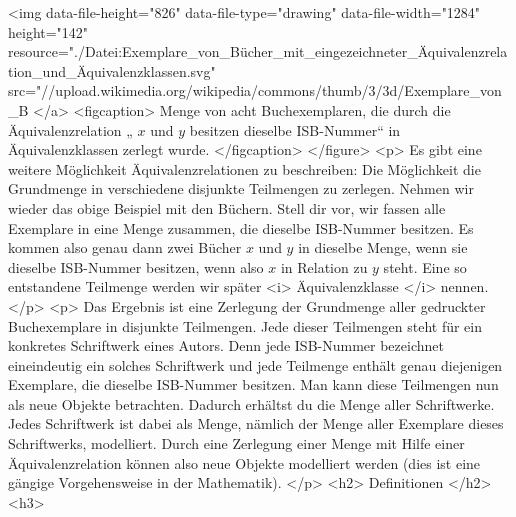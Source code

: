     <img data-file-height="826" data-file-type="drawing" data-file-width="1284" height="142" resource="./Datei:Exemplare_von_Bücher_mit_eingezeichneter_Äquivalenzrelation_und_Äquivalenzklassen.svg" src="//upload.wikimedia.org/wikipedia/commons/thumb/3/3d/Exemplare_von_B%
   </a>
   <figcaption>
    Menge von acht Buchexemplaren, die durch die Äquivalenzrelation „
    $x$
    und
    $y$
    besitzen dieselbe ISB-Nummer“ in Äquivalenzklassen zerlegt wurde.
   </figcaption>
  </figure>
  <p>
   Es gibt eine weitere Möglichkeit Äquivalenzrelationen zu beschreiben: Die Möglichkeit die Grundmenge in verschiedene disjunkte Teilmengen zu zerlegen. Nehmen wir wieder das obige Beispiel mit den Büchern. Stell dir vor, wir fassen alle Exemplare in eine Menge zusammen, die dieselbe ISB-Nummer besitzen. Es kommen also genau dann zwei Bücher
   $x$
   und
   $y$
   in dieselbe Menge, wenn sie dieselbe ISB-Nummer besitzen, wenn also
   $x$
   in Relation zu
   $y$
   steht. Eine so entstandene Teilmenge werden wir später
   <i>
    Äquivalenzklasse
   </i>
   nennen.
  </p>
  <p>
   Das Ergebnis ist eine Zerlegung der Grundmenge aller gedruckter Buchexemplare in disjunkte Teilmengen. Jede dieser Teilmengen steht für ein konkretes Schriftwerk eines Autors. Denn jede ISB-Nummer bezeichnet eineindeutig ein solches Schriftwerk und jede Teilmenge enthält genau diejenigen Exemplare, die dieselbe ISB-Nummer besitzen. Man kann diese Teilmengen nun als neue Objekte betrachten. Dadurch erhältst du die Menge aller Schriftwerke. Jedes Schriftwerk ist dabei als Menge, nämlich der Menge aller Exemplare dieses Schriftwerks, modelliert. Durch eine Zerlegung einer Menge mit Hilfe einer Äquivalenzrelation können also neue Objekte modelliert werden (dies ist eine gängige Vorgehensweise in der Mathematik).
  </p>
  <h2>
   Definitionen
  </h2>
  <h3>
